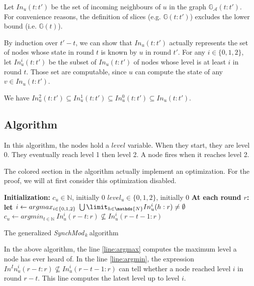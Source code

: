 \documentclass[11pt,letterpaper]{article}
\newcommand{\SM}{{\em SynchMod}$_{\,k}\ $}
\begin{document}
Let $In_u(t:t')$ be the set of incoming neighbours of $u$ in the graph $\mathds{G}_\mathcal{A}(t:t')$.
For convenience reasons, the definition of slices (e.g. $\mathds{G}(t:t')$) excludes the lower bound (i.e. $\mathds{G}(t)$).

By induction over $t'-t$, we can show that $In_u(t:t')$ actually represents the set of nodes whose state in round $t$ is known by $u$ in round $t'$.
For any $i \in \{0, 1, 2\}$, let $In_u^i(t:t')$ be the subset of $In_u(t:t')$ of nodes whose level is at least $i$ in round $t$.
Those set are computable, since $u$ can compute the state of any $v \in In_u(t:t')$.

We have $In_u^2(t:t') \subseteq In_u^1(t:t') \subseteq In_u^0(t:t') \subseteq In_u(t:t')$.

\subsection{Algorithm}

In this algorithm, the nodes hold a $level$ variable. When they start, they are level 0. They eventually reach level 1 then level 2.
A node fires when it reaches level 2.

The colored section in the algorithm actually implement an optimization.
For the proof, we will at first consider this optimization disabled.

\begin{algorithm}[htb]
	\DontPrintSemicolon
	\textbf{Initialization:} \;
	\Indp
		$c_u \in \mathds{N}$, initially 0 \;
		$level_u \in \{0, 1, 2\}$, initially 0 \;
	\BlankLine
	\Indm
	\textbf{At each round $r$:} \;
	\Indp
		\textbf{let} $i \leftarrow argmax_{i \in \{0, 1, 2\}}~\bigcup\limit_{h \in \mathds{N}} In_u^i(h:r) \neq \emptyset$ \;\label{line:argmax}
		$c_u \leftarrow argmin_{t \in \mathds{N}}~In_u^i(r-t:r) \nsubseteq In_u^i(r-t-1:r)$ \;\label{line:argmin} 
	\Indm
\caption{The generalized \SM algorithm} 
\end{algorithm}

In the above algorithm, the line \ref{line:argmax} computes the maximum level a node has ever heard of.
In the line \ref{line:argmin}, the expression $In^In_u^i(r-t:r) \nsubseteq In_u^i(r-t-1:r)$ can tell whether a node reached level $i$ in round $r-t$.
This line computes the latest level up to level $i$.
\end{document}
